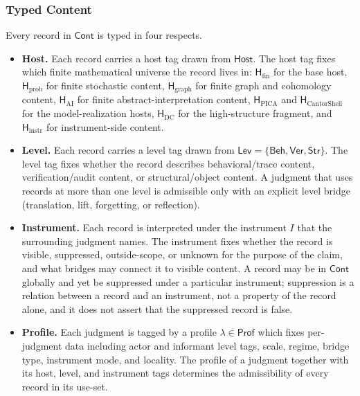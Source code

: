 \documentclass[11pt]{article}
\providecommand{\tightlist}{}
\theoremstyle{definition}
\begin{document}
\subsubsection{Typed Content}

Every record in \(\mathsf{Cont}\) is typed in four respects.

\begin{itemize}
\tightlist
\item
  \textbf{Host.} Each record carries a host tag drawn from \(\mathsf{Host}\). The host tag fixes which finite mathematical universe the record lives in: \(\mathsf H_{\mathrm{fin}}\) for the base host, \(\mathsf H_{\mathrm{prob}}\) for finite stochastic content, \(\mathsf H_{\mathrm{graph}}\) for finite graph and cohomology content, \(\mathsf H_{\mathrm{AI}}\) for finite abstract-interpretation content, \(\mathsf H_{\mathrm{PICA}}\) and \(\mathsf H_{\mathrm{CantorShell}}\) for the model-realization hosts, \(\mathsf H_{\mathrm{DC}}\) for the high-structure fragment, and \(\mathsf H_{\mathrm{instr}}\) for instrument-side content.
\item
  \textbf{Level.} Each record carries a level tag drawn from \(\mathsf{Lev}=\{\mathsf{Beh},\mathsf{Ver},\mathsf{Str}\}\). The level tag fixes whether the record describes behavioral/trace content, verification/audit content, or structural/object content. A judgment that uses records at more than one level is admissible only with an explicit level bridge (translation, lift, forgetting, or reflection).
\item
  \textbf{Instrument.} Each record is interpreted under the instrument \(I\) that the surrounding judgment names. The instrument fixes whether the record is visible, suppressed, outside-scope, or unknown for the purpose of the claim, and what bridges may connect it to visible content. A record may be in \(\mathsf{Cont}\) globally and yet be suppressed under a particular instrument; suppression is a relation between a record and an instrument, not a property of the record alone, and it does not assert that the suppressed record is false.
\item
  \textbf{Profile.} Each judgment is tagged by a profile \(\lambda\in\mathsf{Prof}\) which fixes per-judgment data including actor and informant level tags, scale, regime, bridge type, instrument mode, and locality. The profile of a judgment together with its host, level, and instrument tags determines the admissibility of every record in its use-set.
\end{itemize}
\end{document}

